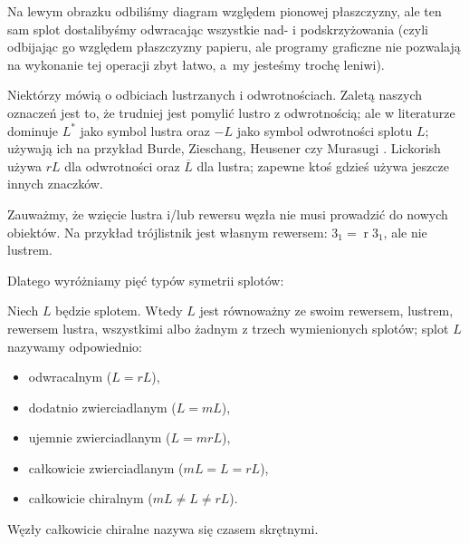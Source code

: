 Na lewym obrazku odbiliśmy diagram względem pionowej płaszczyzny, ale ten sam splot dostalibyśmy odwracając wszystkie nad- i podskrzyżowania (czyli odbijając go względem płaszczyzny papieru, ale programy graficzne nie pozwalają na wykonanie tej operacji zbyt łatwo, a~my jesteśmy trochę leniwi).

Niektórzy mówią o odbiciach lustrzanych i odwrotnościach.
Zaletą naszych oznaczeń jest to, że trudniej jest pomylić lustro z odwrotnością; ale w literaturze dominuje $L^*$ jako symbol lustra oraz $-L$ jako symbol odwrotności splotu $L$; używają ich na przykład Burde, Zieschang, Heusener \cite{burde2014} czy Murasugi \cite[s. 14, 24]{murasugi1996}.
Lickorish \cite[s. 4]{lickorish1997} używa $r L$ dla odwrotności oraz $\overline{L}$ dla lustra; zapewne ktoś gdzieś używa jeszcze innych znaczków.

Zauważmy, że wzięcie lustra i/lub rewersu węzła nie musi prowadzić do nowych obiektów.
Na przykład trójlistnik jest własnym rewersem: $3_1 = \operatorname{r} 3_1$, ale nie lustrem.

Dlatego wyróżniamy pięć typów symetrii splotów:

\begin{definition}
    Niech $L$ będzie splotem.
    Wtedy $L$ jest równoważny ze swoim rewersem, lustrem, rewersem lustra, wszystkimi albo żadnym z trzech wymienionych splotów;
    splot $L$ nazywamy odpowiednio:
    \begin{itemize}
        \item odwracalnym ($L = rL$),
        \item dodatnio zwierciadlanym ($L = mL$),
        \item ujemnie zwierciadlanym ($L = mrL$),
        \item całkowicie zwierciadlanym ($mL = L = rL$),
        \item całkowicie chiralnym ($mL \neq L \neq rL$).
    \end{itemize}
%
%
%
%
\end{definition}

Węzły całkowicie chiralne nazywa się czasem skrętnymi.


